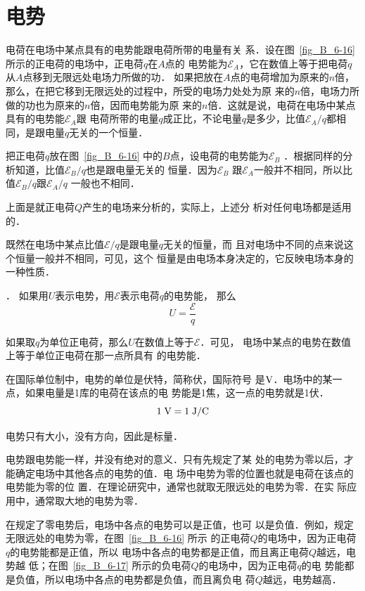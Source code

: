 \section{电势}
电荷在电场中某点具有的电势能跟电荷所带的电量有关
系．设在图~\ref{fig_B_6-16} 所示的正电荷的电场中，正电荷$q$在$A$点的
电势能为$\mathcal{E}_A$，它在数值上等于把电荷$q$从$A$点移到无限远处电场力所做的功．
如果把放在$A$点的电荷增加为原来的$n$倍，
那么，在把它移到无限远处的过程中，所受的电场力处处为原
来的$n$倍，电场力所做的功也为原来的$n$倍，因而电势能为原
来的$n$倍．这就是说，电荷在电场中某点具有的电势能$\mathcal{E}_A$跟
电荷所带的电量$q$成正比，不论电量$q$是多少，比值$\mathcal{E}_A/q$都相
同，是跟电量$q$无关的一个恒量．

把正电荷$q$放在图~\ref{fig_B_6-16} 中的$B$点，设电荷的电势能为$\mathcal{E}_B$
．根据同样的分析知道，比值$\mathcal{E}_B/q$也是跟电量无关的
恒量．因为$\mathcal{E}_B$
跟$\mathcal{E}_A$一般并不相同，所以比值$\mathcal{E}_B/q$跟$\mathcal{E}_A/q$
一般也不相同．

上面是就正电荷$Q$产生的电场来分析的，实际上，上述分
析对任何电场都是适用的．

既然在电场中某点比值$\mathcal{E}/q$是跟电量$q$无关的恒量，而
且对电场中不同的点来说这个恒量一般并不相同，可见，这个
恒量是由电场本身决定的，它反映电场本身的一种性质．

．
如果用$U$表示电势，用$\mathcal{E}$表示电荷$q$的电势能，
那么
\[U=\frac{\mathcal{E}}{q} \]

如果取$q$为单位正电荷，那么$U$在数值上等于$\mathcal{E}$．可见，
电场中某点的电势在数值上等于单位正电荷在那一点所具有
的电势能．

在国际单位制中，电势的单位是伏特，简称伏，国际符号
是$\text{V}$．电场中的某一点，如果电量是1库的电荷在该点的电
势能是1焦，这一点的电势就是1伏．
\[ 1 \;\text{V} =1 \;\text{J}/\text{C} \]

电势只有大小，没有方向，因此是标量．

电势跟电势能一样，并没有绝对的意义．只有先规定了某
处的电势为零以后，才能确定电场中其他各点的电势的值．电
场中电势为零的位置也就是电荷在该点的电势能为零的位
置．在理论研究中，通常也就取无限远处的电势为零．在实
际应用中，通常取大地的电势为零．

在规定了零电势后，电场中各点的电势可以是正值，也可
以是负值．例如，规定无限远处的电势为零，在图~\ref{fig_B_6-16} 所示
的正电荷$Q$的电场中，因为正电荷$q$的电势能都是正值，所以
电场中各点的电势都是正值，而且离正电荷$Q$越远，电势越
低；在图~\ref{fig_B_6-17} 所示的负电荷$Q$的电场中，因为正电荷$q$的电
势能都是负值，所以电场中各点的电势都是负值，而且离负电
荷$Q$越远，电势越高．

